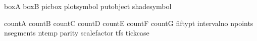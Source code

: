 \newdimen\headingtoplotskip     %
\newdimen\linethickness         %
\newdimen\longticklength        %
\newdimen\plotsymbolspacing     %
\newdimen\shortticklength       %
\newdimen\stackleading          %
\newdimen\tickstovaluesleading  %
\newdimen\totalarclength        %
\newdimen{}  %

\newbox\!boxA                   %
\newbox\!boxB                   %
\newbox\!picbox                 %
\newbox\!plotsymbol             %
\newbox\!putobject              %
\newbox\!shadesymbol            %

\newcount\!countA               %
\newcount\!countB               %
\newcount\!countC               %
\newcount\!countD               %
\newcount\!countE               %
\newcount\!countF               %
\newcount\!countG               %
\newcount\!fiftypt              %
\newcount\!intervalno           %
\newcount\!npoints              %
\newcount\!nsegments            %
\newcount\!ntemp                %
\newcount\!parity               %
\newcount\!scalefactor          %
\newcount\!tfs                  %
\newcount\!tickcase             %

